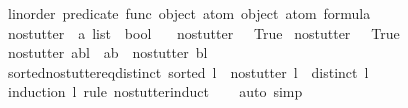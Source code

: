\begin{isabellebody}
\isanewline
{}\isamarkupfalse%
\ linorder\ predicate\ func\ object\ atom\ {\isachardoublequoteopen}object\ atom\ formula{\isachardoublequoteclose}%
\isadelimdocument
%
\endisadelimdocument
%
\isatagdocument
%
\isamarkuptrue%
%
\endisatagdocument
{\isafolddocument}%
%
\isadelimdocument
%
\endisadelimdocument
{}\isamarkupfalse%
\ no{\isacharunderscore}{\kern0pt}stutter\ {\isacharcolon}{\kern0pt}{\isacharcolon}{\kern0pt}\ {\isachardoublequoteopen}{\isacharprime}{\kern0pt}a\ list\ {\isasymRightarrow}\ bool{\isachardoublequoteclose}\ \isanewline
\ \ {\isachardoublequoteopen}no{\isacharunderscore}{\kern0pt}stutter\ {\isacharbrackleft}{\kern0pt}{\isacharbrackright}{\kern0pt}\ {\isacharequal}{\kern0pt}\ True{\isachardoublequoteclose}\isanewline
{\isacharbar}{\kern0pt}\ {\isachardoublequoteopen}no{\isacharunderscore}{\kern0pt}stutter\ {\isacharbrackleft}{\kern0pt}{\isacharunderscore}{\kern0pt}{\isacharbrackright}{\kern0pt}\ {\isacharequal}{\kern0pt}\ True{\isachardoublequoteclose}\isanewline
{\isacharbar}{\kern0pt}\ {\isachardoublequoteopen}no{\isacharunderscore}{\kern0pt}stutter\ {\isacharparenleft}{\kern0pt}a{\isacharhash}{\kern0pt}b{\isacharhash}{\kern0pt}l{\isacharparenright}{\kern0pt}\ {\isacharequal}{\kern0pt}\ {\isacharparenleft}{\kern0pt}a{\isasymnoteq}b\ {\isasymand}\ no{\isacharunderscore}{\kern0pt}stutter\ {\isacharparenleft}{\kern0pt}b{\isacharhash}{\kern0pt}l{\isacharparenright}{\kern0pt}{\isacharparenright}{\kern0pt}{\isachardoublequoteclose}\isanewline
\isanewline
{}\isamarkupfalse%
\ sorted{\isacharunderscore}{\kern0pt}no{\isacharunderscore}{\kern0pt}stutter{\isacharunderscore}{\kern0pt}eq{\isacharunderscore}{\kern0pt}distinct{\isacharcolon}{\kern0pt}\ {\isachardoublequoteopen}sorted\ l\ {\isasymLongrightarrow}\ no{\isacharunderscore}{\kern0pt}stutter\ l\ {\isasymlongleftrightarrow}\ distinct\ l{\isachardoublequoteclose}\isanewline
%
\isadelimproof
\ \ %
\endisadelimproof
%
\isatagproof
{}\isamarkupfalse%
\ {\isacharparenleft}{\kern0pt}induction\ l\ rule{\isacharcolon}{\kern0pt}\ no{\isacharunderscore}{\kern0pt}stutter{\isachardot}{\kern0pt}induct{\isacharparenright}{\kern0pt}\isanewline
\ \ \isamarkupfalse%
\ {\isacharparenleft}{\kern0pt}auto\ simp{\isacharcolon}{\kern0pt}\ {\isacharparenright}{\kern0pt}\isanewline
\ \ \isamarkupfalse%
%
\endisatagproof
{\isafoldproof}%
%
\isadelimproof
\isanewline
%
\endisadelimproof
\isanewline
{}\isamarkupfalse%

\end{isabellebody}
